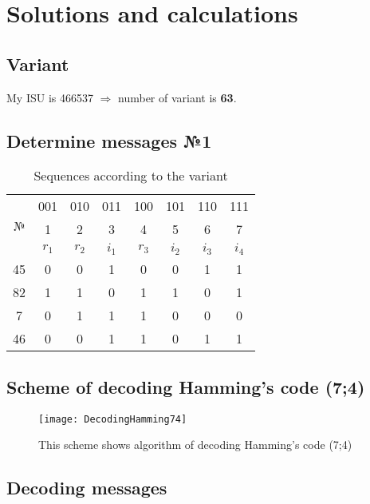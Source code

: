 \documentclass[12pt]{article}
\begin{document}
	\section{\LARGE Solutions and calculations}
	\subsection{\Large Variant}
	My ISU is 466537 \(\Rightarrow\) number of variant is \textbf{63}.
	\subsection{\Large Determine messages №1}
	\begin{table}[h!]
		\centering
		\begin{tabular}{ |c|c|c|c|c|c|c|c| } 
			\hline
			\multirow{3}{2em}{\centering№} & 001 & 010 & 011 & 100 & 101 & 110 & 111 \\
			& 1 & 2 & 3 & 4 & 5 & 6 & 7 \\ 
			& \(r_{1}\) & \(r_{2}\) & \(i_{1}\) & \(r_{3}\) & \(i_{2}\) & \(i_{3}\) & \(i_{4}\) \\
			\hline 
			45 & 0 & 0 & 1 & 0 & 0 & 1 & 1 \\ 
			\hline
			82 & 1 & 1 & 0 & 1 & 1 & 0 & 1 \\
			\hline
			7 & 0 & 1 & 1 & 1 & 0 & 0 & 0 \\ 
			\hline
			46 & 0 & 0 & 1 & 1 & 0 & 1 & 1 \\
			\hline
		\end{tabular}
		\caption{Sequences according to the variant}
		\label{table:data}
	\end{table}
	\subsection{\Large Scheme of decoding Hamming's code (7;4)}
	\begin{figure}[h!]
		\texttt{[image: DecodingHamming74]}
		\caption{This scheme shows algorithm of decoding Hamming's code (7;4)}
		\label{fig:decoding74}
	\end{figure}
	\newpage
	\subsection{\Large Decoding messages}
\end{document}
